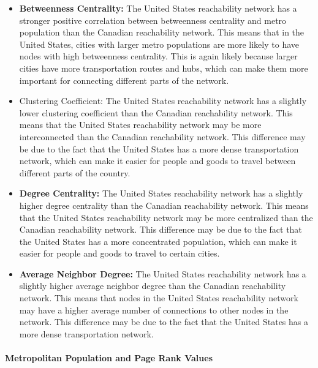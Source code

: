 \begin{itemize}
    \item \textbf{Betweenness Centrality:} The United States reachability network has a stronger positive correlation between betweenness centrality and metro population than the Canadian reachability network. This means that in the United States, cities with larger metro populations are more likely to have nodes with high betweenness centrality. This is again likely because larger cities have more transportation routes and hubs, which can make them more important for connecting different parts of the network.
    
    \item {Clustering Coefficient:} The United States reachability network has a slightly lower clustering coefficient than the Canadian reachability network. This means that the United States reachability network may be more interconnected than the Canadian reachability network. This difference may be due to the fact that the United States has a more dense transportation network, which can make it easier for people and goods to travel between different parts of the country.

    \item \textbf{Degree Centrality:} The United States reachability network has a slightly higher degree centrality than the Canadian reachability network. This means that the United States reachability network may be more centralized than the Canadian reachability network. This difference may be due to the fact that the United States has a more concentrated population, which can make it easier for people and goods to travel to certain cities.

    \item \textbf{Average Neighbor Degree:} The United States reachability network has a slightly higher average neighbor degree than the Canadian reachability network. This means that nodes in the United States reachability network may have a higher average number of connections to other nodes in the network. This difference may be due to the fact that the United States has a more dense transportation network.
\end{itemize}


\paragraph{Metropolitan Population and Page Rank Values}

